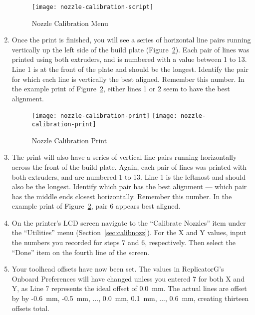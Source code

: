 \begin{enumerate}
\begin{figure}[!htbp]
  \centering
    \texttt{[image: nozzle-calibration-script]}
    \caption{Nozzle Calibration Menu}
  \label{fig:nozzle-calibration-script}
\end{figure}

\item Once the print is finished, you will see a series of horizontal line pairs running vertically up the left side of the build plate (Figure~\ref{fig:nozzle-calibration-print}).  Each pair of lines was printed using both extruders, and is numbered with a value between 1 to 13.  Line 1 is at the front of the plate and should be the longest.  Identify the pair for which each line is vertically the best aligned.  Remember this number.  In the example print of Figure~\ref{fig:nozzle-calibration-print}, either lines 1 or 2 seem to have the best alignment.

\begin{figure}[!htbp]
  \centering
\ifpdf
    \texttt{[image: nozzle-calibration-print]}
\else
    \texttt{[image: nozzle-calibration-print]}
\fi
    \caption{Nozzle Calibration Print}
  \label{fig:nozzle-calibration-print}
\end{figure}

\item The print will also have a series of vertical line pairs running horizontally across the front of the build plate.  Again, each pair of lines was printed with both extruders, and are numbered 1 to 13.  Line 1 is the leftmost and should also be the longest.  Identify which pair has the best alignment --- which pair has the middle ends closest horizontally.  Remember this number.  In the example print of Figure~\ref{fig:nozzle-calibration-print}, pair 6 appears best aligned.

\item On the printer's LCD screen navigate to the ``Calibrate Nozzles'' item under the ``Utilities'' menu (Section~\ref{sec:calibnozz}).  For the X and Y values, input the numbers you recorded for steps 7 and 6, respectively.  Then select the ``Done'' item on the fourth line of the screen.

\item Your toolhead offsets have now been set.  The values in ReplicatorG's Onboard Preferences will have changed unless you entered 7 for both X and Y, as Line 7 represents the ideal offset of 0.0~mm.  The actual lines are offset by by -0.6~mm, -0.5~mm, ..., 0.0~mm, 0.1~mm, ..., 0.6~mm, creating thirteen offsets total.
\end{enumerate}

